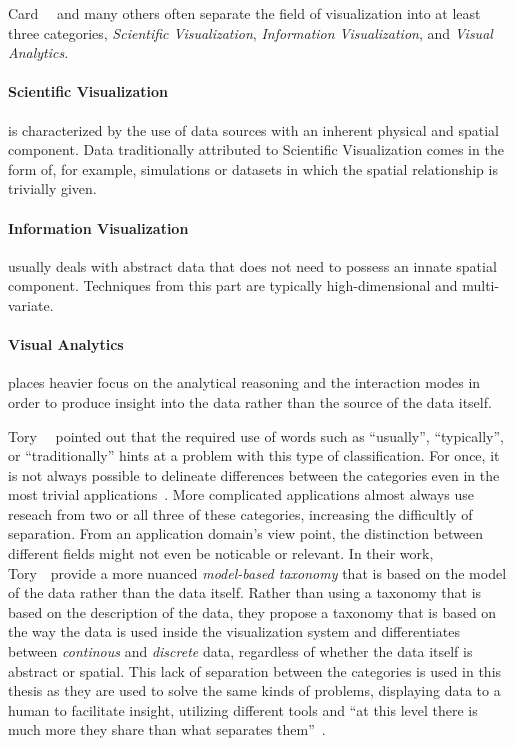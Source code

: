 Card~\etal~\cite{card1999readings} and many others often separate the field of visualization into at least three categories, \emph{Scientific Visualization}, \emph{Information Visualization}, and \emph{Visual Analytics}.  

\paragraph{Scientific Visualization} is characterized by the use of data sources with an inherent physical and spatial component.  Data traditionally attributed to Scientific Visualization comes in the form of, for example, simulations or datasets in which the spatial relationship is trivially given.

\paragraph{Information Visualization} usually deals with abstract data that does not need to possess an innate spatial component.  Techniques from this part are typically high-dimensional and multi-variate.

\paragraph{Visual Analytics} places heavier focus on the analytical reasoning and the interaction modes in order to produce insight into the data rather than the source of the data itself.

\noindent Tory~\etal~\cite{tory2002model} pointed out that the required use of words such as ``usually'', ``typically'', or ``traditionally'' hints at a problem with this type of classification.  For once, it is not always possible to delineate differences between the categories even in the most trivial applications~\cite{rhyne2003information, weiskopf2006scivis}.  More complicated applications almost always use reseach from two or all three of these categories, increasing the difficultly of separation.  From an application domain's view point, the distinction between different fields might not even be noticable or relevant.  In their work, Tory~\etal~provide a more nuanced \emph{model-based taxonomy} that is based on the model of the data rather than the data itself.  Rather than using a taxonomy that is based on the description of the data, they propose a taxonomy that is based on the way the data is used inside the visualization system and differentiates between \emph{continous} and \emph{discrete} data, regardless of whether the data itself is abstract or spatial.  This lack of separation between the categories is used in this thesis as they are used to solve the same kinds of problems, displaying data to a human to facilitate insight, utilizing different tools and ``at this level there is much more they share than what separates them''~\cite{van2005value}.

